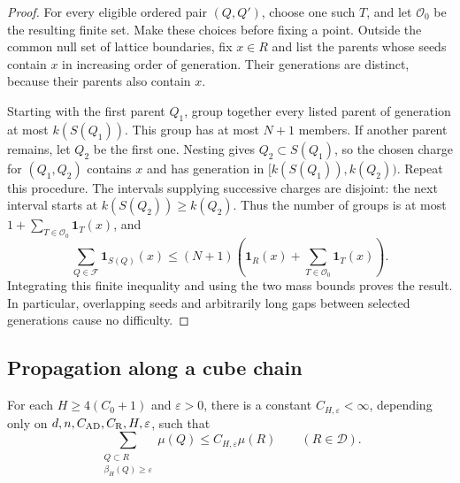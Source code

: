 \begin{proof}
For every eligible ordered pair $(Q,Q')$, choose one such $T$, and let
$\mathcal O_0$ be the resulting finite set.  Make these choices before
fixing a point.  Outside the common null set of lattice boundaries, fix
$x\in R$ and list the parents whose seeds contain $x$ in increasing order
of generation.  Their generations are distinct, because their parents
also contain $x$.

Starting with the first parent $Q_1$, group together every listed parent
of generation at most $k(S(Q_1))$.  This group has at most $N+1$ members.
If another parent remains, let $Q_2$ be the first one.  Nesting gives
$Q_2\subset S(Q_1)$, so the chosen charge for $(Q_1,Q_2)$ contains $x$
and has generation in
$[k(S(Q_1)),k(Q_2))$.  Repeat this procedure.  The intervals supplying
successive charges are disjoint: the next interval starts at
$k(S(Q_2))\geq k(Q_2)$.  Thus the number of groups is at most
$1+\sum_{T\in\mathcal O_0}\mathbf1_T(x)$, and
\[
 \sum_{Q\in\mathcal F}\mathbf1_{S(Q)}(x)
 \leq (N+1)\left(\mathbf1_R(x)
               +\sum_{T\in\mathcal O_0}\mathbf1_T(x)\right).
\]
Integrating this finite inequality and using the two mass bounds proves
the result.  In particular, overlapping seeds and arbitrarily long gaps
between selected generations cause no difficulty.
\end{proof}

\subsection{Propagation along a cube chain}

\begin{proposition}
\label{prop:beta-packing}
For each $H\geq4(C_0+1)$ and $\varepsilon>0$, there is a constant
$C_{H,\varepsilon}<\infty$, depending only on
$d,n,C_{\rm AD},C_{\rm R},H,\varepsilon$, such that
\[
 \sum_{\substack{Q\subset R\\\beta_H(Q)\geq\varepsilon}}\mu(Q)
 \leq C_{H,\varepsilon}\mu(R)
 \qquad(R\in\mathcal D).
\]
\end{proposition}

